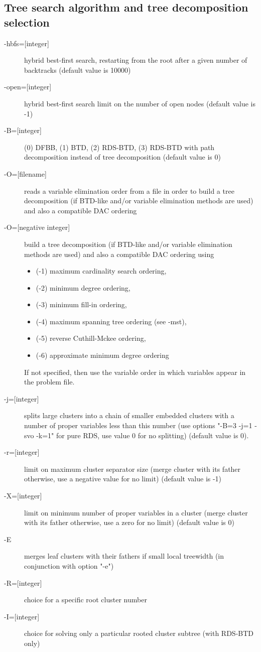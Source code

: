 \documentclass{article}
\begin{document}
\subsection{Tree search algorithm and tree decomposition selection}

\begin{description}
\item[{-hbfs=[integer]}] hybrid best-first search, restarting from the
  root after a given number of backtracks (default value is 10000)
\item[{-open=[integer]}] hybrid best-first search limit on the number
  of open nodes (default value is -1)
\item[{-B=[integer]}] (0) DFBB, (1) BTD, (2) RDS-BTD, (3) RDS-BTD with
  path decomposition instead of tree decomposition (default value is
  0)
\item[{-O=[filename]}] reads a variable elimination order from a file
  in order to build a tree decomposition (if BTD-like and/or variable
  elimination methods are used) and also a compatible DAC ordering
\item[{-O=[negative integer]}] build a tree decomposition (if BTD-like
  and/or variable elimination methods are used) and also a compatible
  DAC ordering using
  \begin{itemize}
    \item (-1) maximum cardinality search ordering, 
    \item (-2) minimum degree ordering, 
    \item (-3) minimum fill-in ordering,
    \item (-4) maximum spanning tree ordering (see -mst), 
    \item (-5) reverse Cuthill-Mckee ordering, 
    \item (-6) approximate minimum degree ordering
    \end{itemize}
    If not specified, then use the variable order in which variables appear in the problem file.
\item[{-j=[integer]}] splits large clusters into a chain of smaller embedded clusters with a number of proper variables less than this number (use options "-B=3 -j=1 -svo -k=1" for pure RDS, use value 0 for no splitting) (default value is 0).
\item[{-r=[integer]}] limit on maximum cluster separator size (merge cluster with its father otherwise, use a negative value for no limit) (default value is -1)
\item[{-X=[integer]}] limit on minimum number of proper variables in a cluster (merge cluster with its father otherwise, use a zero for no limit) (default value is 0)
\item[{-E}] merges leaf clusters with their fathers if small local treewidth (in conjunction with option "-e")
\item[{-R=[integer]}] choice for a specific root cluster number
\item[{-I=[integer]}] choice for solving only a particular rooted cluster subtree (with RDS-BTD only)
 \end{description}
 
\end{document}
